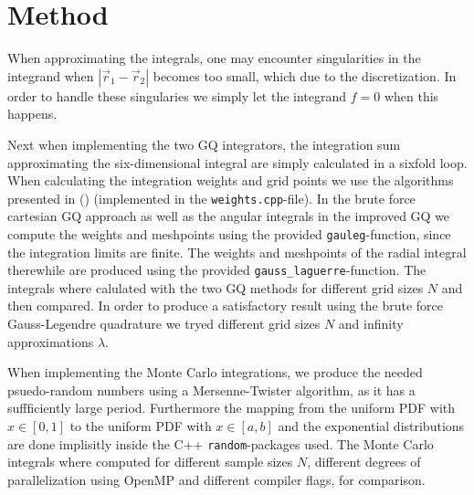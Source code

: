 \documentclass[10pt, twocolumn]{aastex62}
\begin{document}
\section{Method} \label{sec:method}
When approximating the integrals, one may encounter singularities in the
integrand when $|\vec{r}_1 - \vec{r}_2|$ becomes too small, which due to the
discretization. In order to handle these singularies we simply let the integrand
$f=0$ when this happens.

Next when implementing the two GQ integrators, the integration sum approximating
the six-dimensional integral are simply calculated in a sixfold loop. When
calculating the integration weights and grid points we use the algorithms
presented in (\cite{press:2007}) (implemented in the \texttt{weights.cpp}-file).
In the brute force cartesian GQ approach as well as the angular integrals in the
improved GQ we compute the weights and meshpoints using the provided
\texttt{gauleg}-function, since the integration limits are finite. The weights
and meshpoints of the radial integral therewhile are produced using the provided
\texttt{gauss\_laguerre}-function. The integrals where calulated with the two GQ
methods for different grid sizes $N$ and then compared. In order to produce a
satisfactory result using the brute force Gauss-Legendre quadrature we tryed
different grid sizes $N$ and infinity approximations $\lambda$.

When implementing the Monte Carlo integrations, we produce the needed
psuedo-random numbers using a Mersenne-Twister algorithm, as it has a
suffficiently large period. Furthermore the mapping from the uniform PDF with
$x\in[0,1]$ to the uniform PDF with $x\in[a,b]$ and the exponential
distributions are done implisitly inside the C++ \texttt{random}-packages used.
The Monte Carlo integrals where computed for different sample sizes $N$,
different degrees of parallelization using OpenMP and different compiler flags,
for comparison. 
\end{document}
